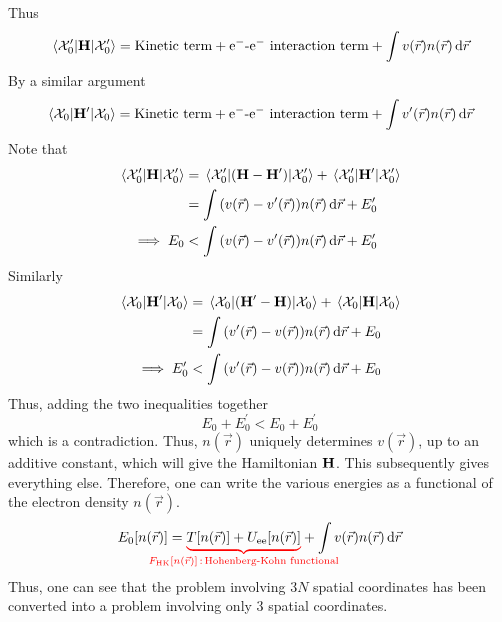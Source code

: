 \documentclass[12pt,a4paper,titlepage]{article}
\newcommand{\trm}[1]{\textrm{#1}} %
\newcommand{\Chi}{\mathcal{X}} %
\begin{document}
{\begin{equation}
\end{equation}
Thus
\begin{equation}
\mel{\Chi_{0}^{\prime}}{\vb{H}}{\Chi_{0}^{\prime}}=\trm{Kinetic term} + \trm{e$^{-}$-e$^{-}$ interaction term}+\int v(\vec{r})n(\vec{r})\dd{\vec{r}}
\end{equation}
By a similar argument
\begin{equation}
\mel{\Chi_{0}}{\vb{H}^{\prime}}{\Chi_{0}}=\trm{Kinetic term} + \trm{e$^{-}$-e$^{-}$ interaction term}+\int v^{\prime}(\vec{r})n(\vec{r})\dd{\vec{r}}
\end{equation}
Note that
\begin{equation}
\begin{aligned}
\mel{\Chi_{0}^{\prime}}{\vb{H}}{\Chi_{0}^{\prime}}&=\mel{\Chi_{0}^{\prime}}{\qty(\vb{H}-\vb{H}^{\prime})}{\Chi_{0}^{\prime}}+\mel{\Chi_{0}^{\prime}}{\vb{H}^{\prime}}{\Chi_{0}^{\prime}}\\
&=\int\qty(v(\vec{r})-v^{\prime}(\vec{r}))n(\vec{r})\dd{\vec{r}}+E_{0}^{\prime}\\
\implies E_{0}&< \int\qty(v(\vec{r})-v^{\prime}(\vec{r}))n(\vec{r})\dd{\vec{r}}+E_{0}^{\prime}
\end{aligned}
\end{equation}
Similarly
\begin{equation}
\begin{aligned}
\mel{\Chi_{0}}{\vb{H}^{\prime}}{\Chi_{0}}&=\mel{\Chi_{0}}{\qty(\vb{H}^{\prime}-\vb{H})}{\Chi_{0}}+\mel{\Chi_{0}}{\vb{H}}{\Chi_{0}}\\
&=\int\qty(v^{\prime}(\vec{r})-v(\vec{r}))n(\vec{r})\dd{\vec{r}}+E_{0}\\
\implies E_{0}^{\prime}&< \int\qty(v^{\prime}(\vec{r})-v(\vec{r}))n(\vec{r})\dd{\vec{r}}+E_{0}
\end{aligned}
\end{equation}
Thus, adding the two inequalities together
\begin{equation}
E_{0}+E_{0}^{\prime}<E_{0}+E_{0}^{\prime}
\end{equation}
which is a contradiction.
}
Thus, $n(\vec{r})$ uniquely determines $v(\vec{r})$, up to an additive constant, which will give the Hamiltonian $\vb{H}$. This subsequently gives everything else. Therefore, one can write the various energies as a functional of the electron density $n(\vec{r})$.
\begin{equation}
E_{0}[n(\vec{r})]={\color{red}\underbrace{\color{black}T[n(\vec{r})]+U_{\trm{ee}}[n(\vec{r})]}_{\mathclap{F_{\trm{HK}}[n(\vec{r})]\,:\,\trm{Hohenberg-Kohn functional}}}}+\int v(\vec{r})n(\vec{r})\dd{\vec{r}}
\end{equation}
Thus, one can see that the problem involving $3N$ spatial coordinates has been converted into a problem involving only 3 spatial coordinates.
\end{document}
